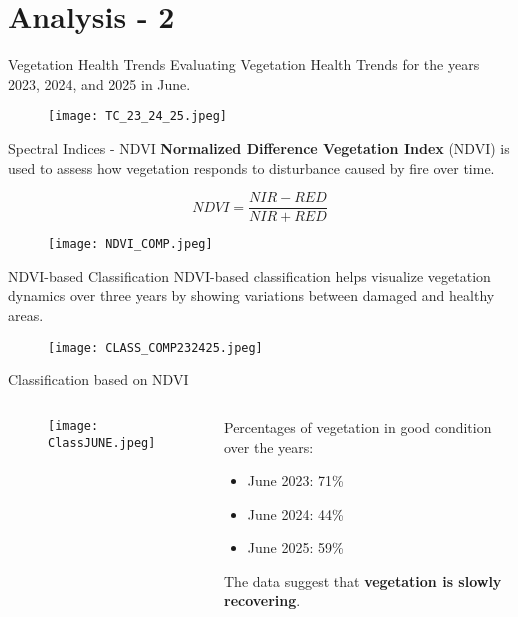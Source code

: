 \documentclass{beamer}
\begin{document}
\section{Analysis - 2} 
\begin{frame}{Vegetation Health Trends}
 \bigskip
Evaluating Vegetation Health Trends for the years 2023, 2024, and 2025 in June.
\begin{figure}
            \texttt{[image: TC\_23\_24\_25.jpeg]}  
            \end{figure}
\end{frame}

\begin{frame}{Spectral Indices - NDVI}
\textbf{Normalized Difference Vegetation Index} (NDVI) is used to assess how vegetation responds to disturbance caused by fire over time.

\centering 
    \begin{equation*}
        NDVI = \frac{NIR - RED}{NIR + RED}
    \end{equation*}
    \begin{figure}
            \texttt{[image: NDVI\_COMP.jpeg]}  
    \end{figure}
\end{frame}

\begin{frame}{NDVI-based Classification}
\bigskip
NDVI-based classification helps visualize vegetation dynamics over three years by showing variations between damaged and healthy areas. 
\begin{figure}
        \texttt{[image: CLASS\_COMP232425.jpeg]}  
    \end{figure}
\end{frame}

\begin{frame}{Classification based on NDVI}

\begin{columns}

    \begin{column}{0.6\textwidth}
    
        \begin{figure}
        \centering
                \texttt{[image: ClassJUNE.jpeg]}  
        \end{figure}
    \end{column}

    \begin{column}{0.4\textwidth}
    Percentages of vegetation in good condition over the years: \begin{itemize}
            \item June 2023: 71\%
            \item June 2024: 44\%
            \item June 2025: 59\%
        \end{itemize}
        \bigskip
    The data suggest that \textbf{vegetation is slowly recovering}.
    \end{column}

\end{columns}
\end{frame}
\end{document}
